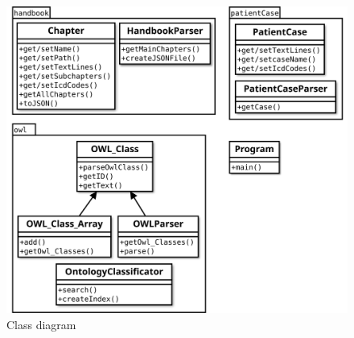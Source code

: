 \begin{figure}[htb]
\begin{center}
    \includegraphics[width=\textwidth]{figures/class-diagram}
\end{center}
\caption{Class diagram}
\label{fig:class-diagram}
\end{figure}

